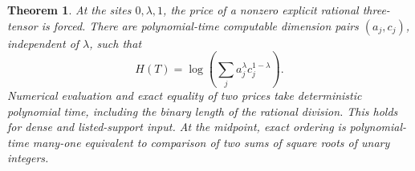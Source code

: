 \documentclass[11pt,letterpaper]{article}
\newtheorem{theorem}{Theorem}[section]
\theoremstyle{definition}
\begin{document}
\begin{theorem}\label{thm:line}
At the sites \(0,\lambda,1\), the price of a nonzero explicit rational
three-tensor is forced. There are polynomial-time computable dimension
pairs \((a_j,c_j)\), independent of \(\lambda\), such that
\begin{equation}
 H(T)=\log\!\left(\sum_j a_j^\lambda c_j^{1-\lambda}\right).
 \label{eq:line}
\end{equation}
Numerical evaluation and exact equality of two prices take deterministic
polynomial time, including the binary length of the rational division.
This holds for dense and listed-support input. At the midpoint, exact
ordering is polynomial-time many-one equivalent to comparison of two sums
of square roots of unary integers.
\end{theorem}
\end{document}
